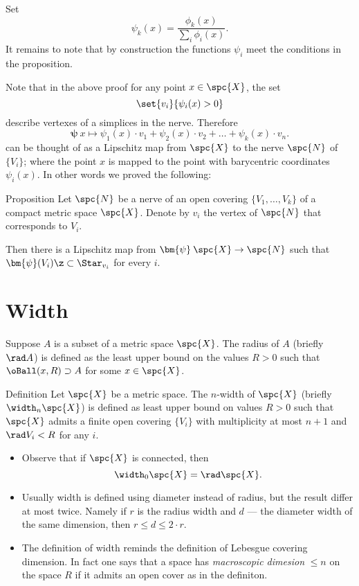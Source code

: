 Set 
$$\psi_k(x)=\frac{\phi_k(x)}{\sum_i\phi_i(x)}.$$
It remains to note that by construction the functions $\psi_i$ meet the conditions in the proposition.
\qedsf


Note that in the above proof for any point $x\in {\spc{X}}$,
the set
$$\set{v_i}{\psi_i(x)>0}$$
describe vertexes of a simplices in the nerve.
Therefore 
$$\bm{\psi}\:x\mapsto \psi_1(x)\cdot v_1+\psi_2(x)\cdot v_2+\dots+\psi_k(x)\cdot v_n.$$
can be thought of as a Lipschitz map from ${\spc{X}}$ to the nerve $\spc{N}$ of $\{V_i\}$;
where the point $x$ is mapped to the point with barycentric coordinates $\psi_i(x)$.
In other words we proved the following:

\begin{thm}{Proposition}\label{prop:space->nerve}
Let $\spc{N}$ be a nerve of an open covering $\{V_1,\dots,V_k\}$ of a compact metric space $\spc{X}$.
Denote by $v_i$ the vertex of $\spc{N}$ that corresponds to $V_i$.

Then there is a Lipschitz map from $\bm{\psi}\:\spc{X}\to\spc{N}$ such that $\bm{\psi}(V_i)\z\subset\Star_{v_i}$ for every $i$.
\end{thm}


\section{Width}

Suppose $A$ is a subset of a metric space $\spc{X}$.
The radius of $A$ (briefly $\rad A$) is defined as the least upper bound on the values $R>0$ such that $\oBall(x,R)\supset A$ for some $x\in \spc{X}$.

\begin{thm}{Definition}\label{def:width}
Let $\spc{X}$ be a metric space.
The $n$-width of $\spc{X}$ (briefly $\width_n\spc{X}$) is defined as least upper bound on values $R>0$ such that $\spc{X}$ admits a finite open covering $\{V_i\}$ with multiplicity at most $n+1$ and $\rad V_i< R$ for any $i$.
\end{thm}

\begin{itemize}
\item Observe that if $\spc{X}$ is connected, then 
\[\width_0\spc{X}=\rad\spc{X}.\]
\item 
Usually width is defined using diameter instead of radius, but the result differ at most twice.
Namely if $r$ is the radius width and $d$ --- the diameter width of the same dimension, then 
$r\le d\le 2\cdot r$.

\item The definition of width reminds the definition of Lebesgue covering dimension.
In fact one says that a space has \emph{macroscopic dimesion} $\le n$ on the space $R$ if it admits an open cover as in the definiton.
\end{itemize}

